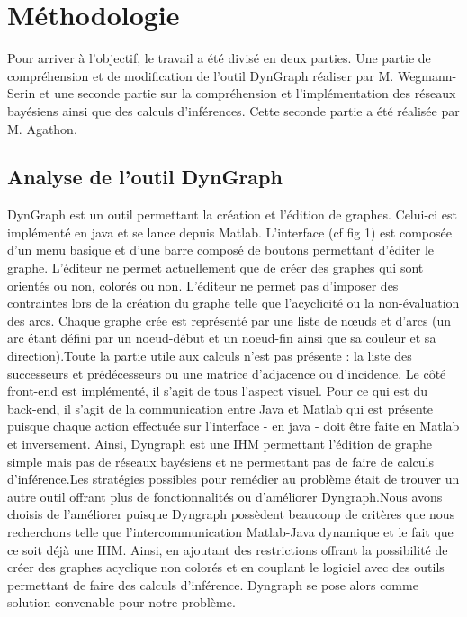 \documentclass[conference]{IEEEtran}
\begin{document}


\section{Méthodologie}

Pour arriver à l'objectif, le travail a été divisé en deux parties. Une partie de compréhension et de modification de l'outil DynGraph réaliser par M. Wegmann-Serin et une seconde partie sur la compréhension et l'implémentation des réseaux bayésiens ainsi que des calculs d'inférences. Cette seconde partie a été réalisée par M. Agathon. \\


\subsection{Analyse de l'outil DynGraph}
\vspace{0.3cm} 

DynGraph est un outil permettant la création et l'édition de graphes. Celui-ci est implémenté en java et se lance depuis Matlab.
L'interface (cf fig 1) est composée d'un menu basique et d'une barre composé de boutons permettant d'éditer le graphe. L'éditeur ne permet actuellement que de créer des graphes qui sont orientés ou non, colorés ou non. L'éditeur ne permet pas d'imposer des contraintes lors de la création du graphe telle que l'acyclicité ou la non-évaluation des arcs. Chaque graphe crée est représenté par une liste de nœuds et d'arcs (un arc étant défini par un noeud-début et un noeud-fin ainsi que sa couleur et sa direction).Toute la partie utile aux calculs n'est pas présente : la liste des successeurs et prédécesseurs ou une matrice d'adjacence ou d'incidence. Le côté front-end est implémenté, il s'agit de tous l'aspect visuel. Pour ce qui est du back-end, il s'agit de la communication entre Java et Matlab qui est présente puisque chaque action effectuée sur l'interface - en java - doit être faite en Matlab et inversement. Ainsi, Dyngraph est une IHM permettant l'édition de graphe simple mais pas de réseaux bayésiens et ne permettant pas de faire de calculs d'inférence.Les stratégies possibles pour remédier au problème était de trouver un autre outil offrant plus de fonctionnalités ou d'améliorer Dyngraph.Nous avons choisis de l'améliorer puisque Dyngraph possèdent beaucoup de critères que nous recherchons telle que l'intercommunication Matlab-Java dynamique et le fait que ce soit déjà une IHM. Ainsi, en ajoutant des restrictions offrant la possibilité de créer des graphes acyclique non colorés et en couplant le logiciel avec des outils permettant de faire des calculs d'inférence. Dyngraph se pose alors comme solution convenable pour notre problème.
\end{document}
